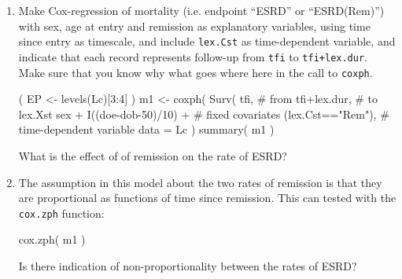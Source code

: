 \begin{enumerate}
\begin{Schunk}
\begin{Sinput}
 par( mai=c(3,3,1,1)/4, mgp=c(3,1,0)/1.6 )
 plot( Lc, col=c("red","limegreen")[Lc$lex.Cst],
       xlab="Calendar time", ylab="Age",
       lwd=3, grid=0:20*5, xlim=c(1970,2010), ylim=c(0,80), xaxs="i", yaxs="i", las=1 )
 points( Lc, pch=c(NA,NA,16)[Lc$lex.Xst],
             col=c("red","limegreen","transparent")[Lc$lex.Cst])
 points( Lc, pch=c(NA,NA,1)[Lc$lex.Xst],
             col="black", lwd=2 )
\end{Sinput}
\end{Schunk}
\item Make Cox-regression of mortality (i.e. endpoint ``ESRD'' or
  ``ESRD(Rem)'') with sex, age at entry and remission as
  explanatory variables, using time since entry as timescale, and
  include \texttt{lex.Cst} as time-dependent variable, and
  indicate that each record represents follow-up from
  \texttt{tfi} to \texttt{tfi+lex.dur}. Make sure that you know
  why what goes where here in the call to \texttt{coxph}.
\begin{Schunk}
\begin{Sinput}
 ( EP <- levels(Lc)[3:4] )
 m1 <- coxph( Surv( tfi,                  # from
                    tfi+lex.dur,          # to
                    lex.Xst %in% EP ) ~   # event
              sex + I((doe-dob-50)/10) +  # fixed covariates
              (lex.Cst=="Rem"),           # time-dependent variable 
              data = Lc )
 summary( m1 )
\end{Sinput}
\end{Schunk}
What is the effect of of remission on the rate of ESRD? 
\item The assumption in this model about the two rates of remission is
  that they are proportional as functions of time since
  remission. This can tested with the \texttt{cox.zph} function:
\begin{Schunk}
\begin{Sinput}
 cox.zph( m1 )
\end{Sinput}
\end{Schunk}
 Is there indication of non-proportionality between the rates of ESRD?
\end{enumerate}
